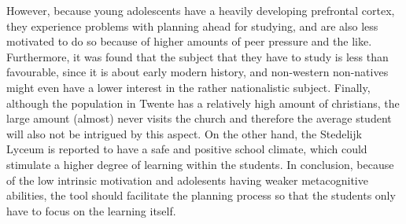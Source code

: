 However, because young adolescents have a heavily developing prefrontal cortex, they experience problems with planning ahead for studying, and are also less motivated to do so because of higher amounts of peer pressure and the like. Furthermore, it was found that the subject that they have to study is less than favourable, since it is about early modern history, and non-western non-natives might even have a lower interest in the rather nationalistic subject. Finally, although the population in Twente has a relatively high amount of christians, the large amount (almost) never visits the church and therefore the average student will also not be intrigued by this aspect. On the other hand, the Stedelijk Lyceum is reported to have a safe and positive school climate, which could stimulate a higher degree of learning within the students. In conclusion, because of the low intrinsic motivation and adolesents having weaker metacognitive abilities, the tool should facilitate the planning process so that the students only have to focus on the learning itself.
